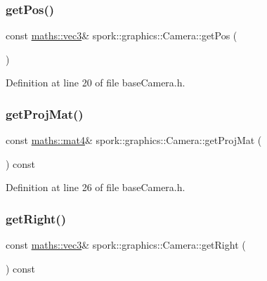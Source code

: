 \subsubsection{\texorpdfstring{get\+Pos()}{getPos()}}
{\footnotesize\ttfamily const \hyperlink{structspork_1_1maths_1_1vec3}{maths\+::vec3}\& spork\+::graphics\+::\+Camera\+::get\+Pos (\begin{DoxyParamCaption}{ }\end{DoxyParamCaption})\hspace{0.3cm}{\ttfamily [inline]}}



Definition at line 20 of file base\+Camera.\+h.

\mbox{\label{classspork_1_1graphics_1_1_camera_a7f02442363f407cbdb137fac4bf9ffcb}} 
\subsubsection{\texorpdfstring{get\+Proj\+Mat()}{getProjMat()}}
{\footnotesize\ttfamily const \hyperlink{structspork_1_1maths_1_1mat4}{maths\+::mat4}\& spork\+::graphics\+::\+Camera\+::get\+Proj\+Mat (\begin{DoxyParamCaption}{ }\end{DoxyParamCaption}) const\hspace{0.3cm}{\ttfamily [inline]}}



Definition at line 26 of file base\+Camera.\+h.

\mbox{\label{classspork_1_1graphics_1_1_camera_a46f5ae89d30d350d782cdd694608a2a9}} 
\subsubsection{\texorpdfstring{get\+Right()}{getRight()}}
{\footnotesize\ttfamily const \hyperlink{structspork_1_1maths_1_1vec3}{maths\+::vec3}\& spork\+::graphics\+::\+Camera\+::get\+Right (\begin{DoxyParamCaption}{ }\end{DoxyParamCaption}) const\hspace{0.3cm}{\ttfamily [inline]}}



